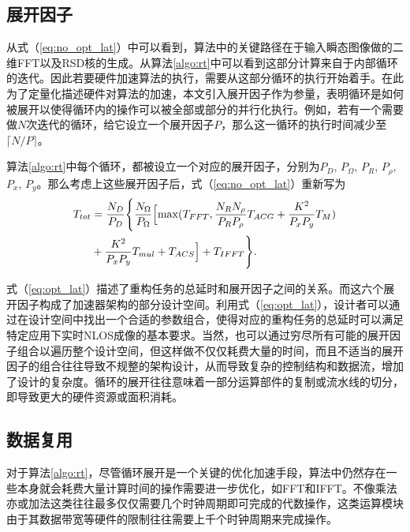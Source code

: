 \documentclass[master]{shtthesis}             %
\begin{document}
\subsection{展开因子}

从式（\ref{eq:no_opt_lat}）中可以看到，算法中的关键路径在于输入瞬态图像做的二维FFT以及RSD核的生成。从算法\ref{algo:rt}中可以看到这部分计算来自于内部循环的迭代。因此若要硬件加速算法的执行，需要从这部分循环的执行开始着手。在此为了定量化描述硬件对算法的加速，本文引入展开因子作为参量，表明循环是如何被展开以使得循环内的操作可以被全部或部分的并行化执行。例如，若有一个需要做$N$次迭代的循环，给它设立一个展开因子$P$，那么这一循环的执行时间减少至$\lceil N/P \rceil$。

算法\ref{algo:rt}中每个循环，都被设立一个对应的展开因子，分别为$P_D$, $P_\Omega$, $P_R$, $P_\rho$, $P_x$, $P_y$。那么考虑上这些展开因子后，式（\ref{eq:no_opt_lat}）重新写为
\begin{equation}
    \begin{split}
        T_{tot} &= \frac{N_D}{P_D} \Biggl\{ \frac{N_{\Omega}}{P_{\Omega}} \Bigl[ \max (T_{FFT}, \frac{N_{ {R}}N_{\rho}}{P_{ {R}}P_{\rho}} T_{ACG}+\frac{K^2}{P_xP_y}T_M)\\ &+ \frac{K^2}{P_xP_y}T_{mul}+T_{ACS} \Bigr] + T_{IFFT}\Biggr\} \label{eq:opt_lat}.
    \end{split}
\end{equation}

式（\ref{eq:opt_lat}）描述了重构任务的总延时和展开因子之间的关系。而这六个展开因子构成了加速器架构的部分设计空间。利用式（\ref{eq:opt_lat}），设计者可以通过在设计空间中找出一个合适的参数组合，使得对应的重构任务的总延时可以满足特定应用下实时NLOS成像的基本要求。当然，也可以通过穷尽所有可能的展开因子组合以遍历整个设计空间，但这样做不仅仅耗费大量的时间，而且不适当的展开因子的组合往往导致不规整的架构设计，从而导致复杂的控制结构和数据流，增加了设计的复杂度。循环的展开往往意味着一部分运算部件的复制或流水线的切分，即导致更大的硬件资源或面积消耗。%

\subsection{数据复用}

对于算法\ref{algo:rt}，尽管循环展开是一个关键的优化加速手段，算法中仍然存在一些本身就会耗费大量计算时间的操作需要进一步优化，如FFT和IFFT。不像乘法亦或加法这类往往最多仅仅需要几个时钟周期即可完成的代数操作，这类运算模块由于其数据带宽等硬件的限制往往需要上千个时钟周期来完成操作。
\end{document}
